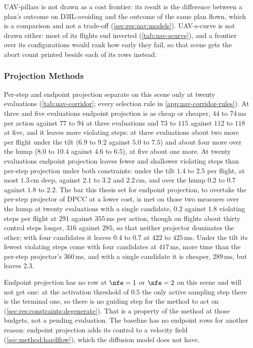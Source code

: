 UAV-pillars is not drawn as a cost frontier: its result is the difference between a plan's outcome on
D3IL-avoiding and the outcome of the same plan flown, which is a comparison and not a trade-off
(\autoref{sec:res:uav:models}). UAV-s-curve is not drawn either: most of its flights end inverted
(\autoref{tab:uav-scurve}), and a frontier over its configurations would rank how early they fail, so that
scene gets the abort count printed beside each of its rows instead.

\FloatBarrier
\subsubsection{Projection Methods}\label{sec:res:uav:projection}
Per-step and endpoint projection separate on this scene only at twenty evaluations
(\autoref{tab:uav-corridor}; every selection rule in \autoref{app:uav-corridor-rules}). At three and five
evaluations endpoint projection is as cheap or cheaper, $44$ to $74$\,ms per action against $77$ to $94$ at
three evaluations and $73$ to $115$ against $112$ to $118$ at five, and it leaves more violating steps: at
three evaluations about two more per flight under the tilt ($6.9$ to $9.2$ against $5.0$ to $7.5$) and about
four more over the hump ($8.0$ to $10.4$ against $4.6$ to $6.5$), at five about one more. At twenty
evaluations endpoint projection leaves fewer and shallower violating steps than per-step projection under
both constraints: under the tilt $1.4$ to $2.5$ per flight, at most $1.3$\,cm deep, against $2.1$ to $3.2$
and $2.2$\,cm, and over the hump $0.2$ to $0.7$ against $1.8$ to $2.2$. The bar this thesis set for endpoint
projection, to overtake the per-step projector of \ac{DPCC} at a lower cost, is met on those two measures over
the hump at twenty evaluations with a single candidate, $0.2$ against $1.8$ violating steps per flight at $291$
against $355$\,ms per action, though on flights about thirty control steps longer, $316$ against $285$, so that
neither projector dominates the other; with four candidates it leaves $0.4$ to $0.7$ at $422$ to $425$\,ms. Under the tilt
its fewest violating steps come with four candidates at $417$\,ms, more time than the per-step projector's
$360$\,ms, and with a single candidate it is cheaper, $289$\,ms, but leaves $2.3$.

Endpoint projection has no row at $\nfe=1$ or $\nfe=2$ on this scene and will not get one: at the
activation threshold of $0.5$ the only active sampling step there is the terminal one, so there is no
guiding step for the method to act on (\autoref{sec:res:constraints:degenerate}). That is a property of
the method at those budgets, not a pending evaluation. The baseline has no endpoint rows for another
reason: endpoint projection adds its control to a velocity field (\autoref{sec:method:hardflow}), which
the diffusion model does not have.

